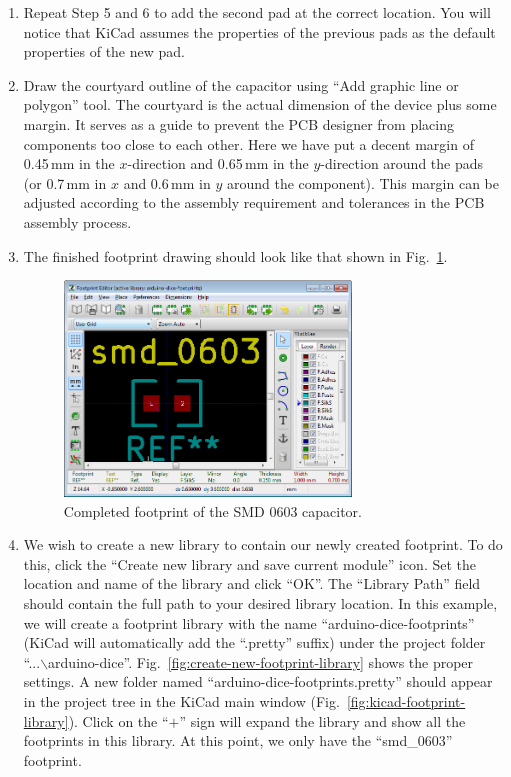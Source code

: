 \documentclass[12pt,letterpaper]{scrartcl}
\begin{document}
\begin{enumerate}
	\item Repeat Step 5 and 6 to add the second pad at the correct location. You will notice that KiCad assumes the properties of the previous pads as the default properties of the new pad. 
	
	\item Draw the courtyard outline of the capacitor using ``Add graphic line or polygon'' tool. The courtyard is the actual dimension of the device plus some margin. It serves as a guide to prevent the PCB designer from placing components too close to each other. Here we have put a decent margin of 0.45\,mm in the $x $-direction and 0.65\,mm in the $y$-direction around the pads (or 0.7\,mm in $x$ and 0.6\,mm in $y$ around the component). This margin can be adjusted according to the assembly requirement and tolerances in the PCB assembly process.  
	  
	\item The finished footprint drawing should look like that shown in Fig.~\ref{fig:smd_cap_footprint_final}.
		
		\begin{figure}[hp]
			\centering
			\includegraphics[width=3in]{smd_cap_footprint_final}
			\caption{Completed footprint of the SMD 0603 capacitor.}
			\label{fig:smd_cap_footprint_final}
		\end{figure}
			
	\item We wish to create a new library to contain our newly created footprint. To do this, click the ``Create new library and save current module'' icon. Set the location and name of the library and click ``OK''. The ``Library Path'' field should contain the full path to your desired library location. In this example, we will create a footprint library with the name ``arduino-dice-footprints'' (KiCad will automatically add the ``.pretty'' suffix) under the project folder ``...$\backslash$arduino-dice''. Fig.~\ref{fig:create-new-footprint-library} shows the proper settings. A new folder named ``arduino-dice-footprints.pretty'' should appear in the project tree in the KiCad main window (Fig.~\ref{fig:kicad-footprint-library}). Click on the ``$+$'' sign will expand the library and show all the footprints in this library. At this point, we only have the ``smd\_0603'' footprint.
	

\end{enumerate}
\end{document}
